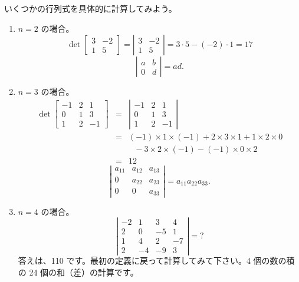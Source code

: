 \begin{eg}
いくつかの行列式を具体的に計算してみよう。
\begin{enumerate}
\item $n=2$ の場合。
$$\det\left[\begin{array}{cc}3 & -2 \\1 & 5\end{array}\right] = 
\left|\begin{array}{cc}3 & -2 \\1 & 5\end{array}\right| = 
3\cdot 5 - (-2)\cdot 1 = 17$$
$$\left|\begin{array}{cc}a & b \\0 & d\end{array}\right| = ad.$$

\item $n = 3$ の場合。
\begin{eqnarray*}
\det\left[\begin{array}{ccc}-1 & 2 & 1\\0 & 1 & 3\\ 1 & 2 & -1\end{array}\right]
& = & \left|\begin{array}{ccc}-1 & 2 & 1\\0 & 1 & 3\\ 1 & 2 & -1\end{array}\right|\\
& = & (-1)\times 1\times (-1) + 2\times 3\times 1 + 1\times 2 \times 0 \\
& & \mbox{ }-3\times 2\times (-1) - (-1)\times 0 \times 2\\
& = & 12
\end{eqnarray*}
$$\left|\begin{array}{ccc}a_{11} & a_{12} & a_{13}\\0 & a_{22} & a_{23}\\ 0 & 0 & a_{33}\end{array}\right| = a_{11}a_{22}a_{33}.$$

\item $n=4$ の場合。
$$\left|\begin{array}{cccc}-2 & 1 & 3 & 4 \\2 & 0 & -5 & 1\\ 1 & 4  & 2 & -7 \\ 2 & -4 & -9 & 3\end{array}\right| = ?$$
答えは、110 です。最初の定義に戻って計算してみて下さい。4 個の数の積の 24 個の和（差）の計算です。
\end{enumerate}
\end{eg}

